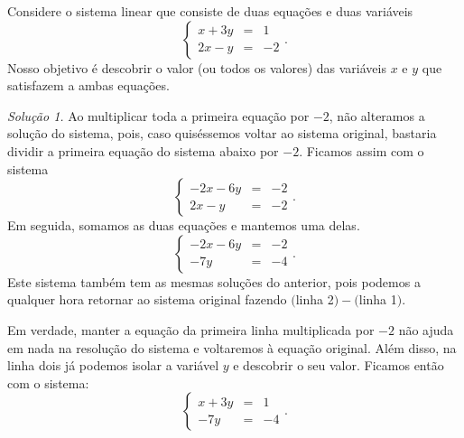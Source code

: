 \documentclass[../livro.tex]{subfiles} %
\begin{document}
\begin{example}
Considere o sistema linear que consiste de duas equações e duas variáveis
\begin{equation}\label{exp1}
  \left\{
    \begin{array}{rcl}
      x+3y&=&1 \\
      2x-y&=&-2
    \end{array}
  \right..
\end{equation} Nosso objetivo é descobrir o valor (ou todos os valores) das variáveis $x$ e $y$ que satisfazem a ambas equações.

\vspace{0.2cm}

\noindent\textit{Solução 1.} Ao multiplicar toda a primeira equação por $-2$, não alteramos a solução do sistema, pois, caso quiséssemos voltar ao sistema original, bastaria dividir a primeira equação do sistema abaixo por $-2$. Ficamos assim com o sistema
\begin{equation}
  \left\{
    \begin{array}{rcl}
      -2x-6y&=&-2 \\
      2x-y&=&-2
    \end{array}
  \right..
\end{equation} Em seguida, somamos as duas equações e mantemos uma delas.
\begin{equation}
  \left\{
    \begin{array}{rcl}
      -2x-6y&=& -2 \\
      -7y & =& -4
    \end{array}
  \right..
\end{equation} Este sistema também tem as mesmas soluções do anterior, pois podemos a qualquer hora retornar ao sistema original fazendo $($linha 2$)-($linha 1$)$.

Em verdade, manter a equação da primeira linha multiplicada por $-2$ não ajuda em nada na resolução do sistema e voltaremos à equação original. Além disso, na linha dois já podemos isolar a variável $y$ e descobrir o seu valor. Ficamos então com o sistema:
\begin{equation}\label{exp1-2}
  \left\{
    \begin{array}{rcl}
      x+3y&=& 1 \\
      -7y & =& -4
    \end{array}
  \right..
\end{equation}


\end{example}
\end{document}
